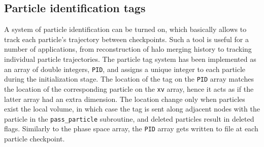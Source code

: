 \subsection{Particle identification tags}
\label{PID}

A system of particle identification can be turned on, which basically allows to track each particle's trajectory
between checkpoints. Such a tool is useful for a number of applications, from reconstruction of halo merging history to tracking individual particle
trajectories.
The particle tag system has been implemented as an array of double integers, {\tt PID}, 
and assigns a unique integer to each particle during the initialization stage. The location of the tag on the {\tt PID} array 
matches the location of the corresponding particle on the {\tt xv} array, hence it acts as if the latter array had an extra dimension.
The location change only when particles exist the local volume, in which case the tag is sent along adjacent nodes 
with the particle in the {\tt pass\_particle} subroutine, and deleted particles result in deleted flags.
Similarly to the phase space array, the {\tt PID} array gets written to file at each particle checkpoint.
